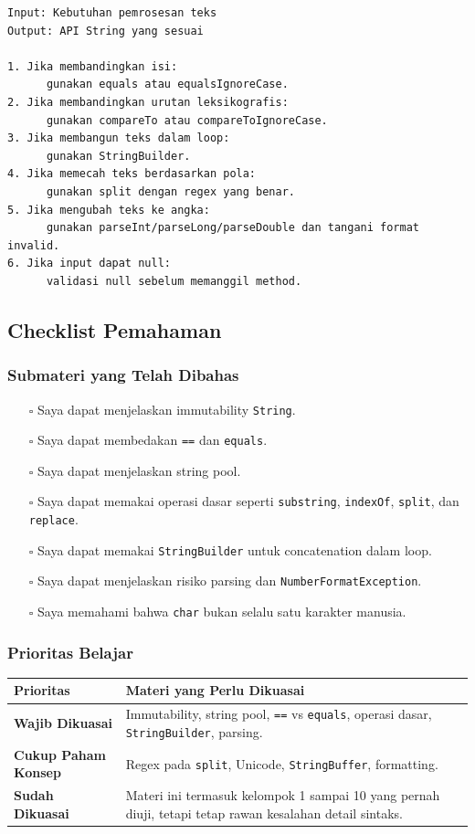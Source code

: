 \begin{lstlisting}[caption={Pseudocode pemilihan operasi String}, label={lst:string-decision}]
Input: Kebutuhan pemrosesan teks
Output: API String yang sesuai

1. Jika membandingkan isi:
      gunakan equals atau equalsIgnoreCase.
2. Jika membandingkan urutan leksikografis:
      gunakan compareTo atau compareToIgnoreCase.
3. Jika membangun teks dalam loop:
      gunakan StringBuilder.
4. Jika memecah teks berdasarkan pola:
      gunakan split dengan regex yang benar.
5. Jika mengubah teks ke angka:
      gunakan parseInt/parseLong/parseDouble dan tangani format invalid.
6. Jika input dapat null:
      validasi null sebelum memanggil method.
\end{lstlisting}

\subsection{Checklist Pemahaman}

\subsubsection{Submateri yang Telah Dibahas}

\begin{itemize}
    \item[$\square$] Saya dapat menjelaskan immutability \texttt{String}.
    \item[$\square$] Saya dapat membedakan \texttt{==} dan \texttt{equals}.
    \item[$\square$] Saya dapat menjelaskan string pool.
    \item[$\square$] Saya dapat memakai operasi dasar seperti \texttt{substring}, \texttt{indexOf}, \texttt{split}, dan \texttt{replace}.
    \item[$\square$] Saya dapat memakai \texttt{StringBuilder} untuk concatenation dalam loop.
    \item[$\square$] Saya dapat menjelaskan risiko parsing dan \texttt{NumberFormatException}.
    \item[$\square$] Saya memahami bahwa \texttt{char} bukan selalu satu karakter manusia.
\end{itemize}

\subsubsection{Prioritas Belajar}

\begin{tabularx}{\textwidth}{|L{0.22\textwidth}|X|}
\hline
\textbf{Prioritas} & \textbf{Materi yang Perlu Dikuasai} \\
\hline
\textbf{Wajib Dikuasai} & Immutability, string pool, \texttt{==} vs \texttt{equals}, operasi dasar, \texttt{StringBuilder}, parsing. \\
\hline
\textbf{Cukup Paham Konsep} & Regex pada \texttt{split}, Unicode, \texttt{StringBuffer}, formatting. \\
\hline
\textbf{Sudah Dikuasai} & Materi ini termasuk kelompok 1 sampai 10 yang pernah diuji, tetapi tetap rawan kesalahan detail sintaks. \\
\hline
\end{tabularx}

